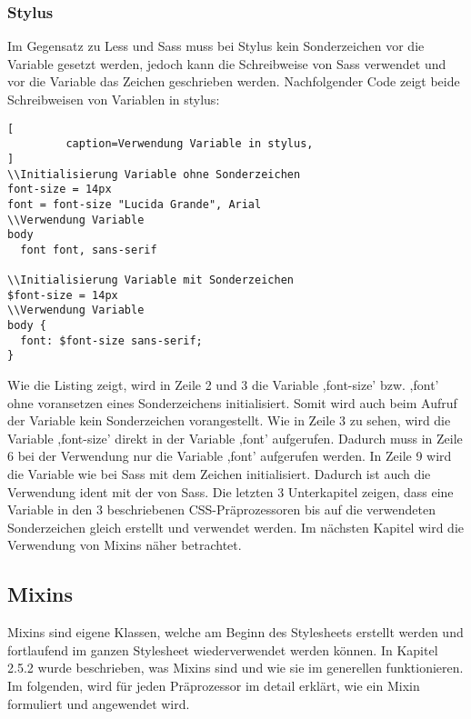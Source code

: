 \subsubsection{Stylus}
Im Gegensatz zu Less und Sass muss bei Stylus kein Sonderzeichen vor die Variable gesetzt werden, jedoch kann die Schreibweise von Sass verwendet und vor die Variable das Zeichen \grqq{\$}\glqq{} geschrieben werden. Nachfolgender Code zeigt beide Schreibweisen von Variablen in stylus:
\begin{lstlisting}[
         caption=Verwendung Variable in stylus,
]
\\Initialisierung Variable ohne Sonderzeichen
font-size = 14px
font = font-size "Lucida Grande", Arial
\\Verwendung Variable
body
  font font, sans-serif

\\Initialisierung Variable mit Sonderzeichen
$font-size = 14px
\\Verwendung Variable
body {
  font: $font-size sans-serif;
}
\end{lstlisting}
Wie die Listing zeigt, wird in Zeile 2 und 3 die Variable ,font-size' bzw. ,font' ohne voransetzen eines Sonderzeichens initialisiert. Somit wird auch beim Aufruf der Variable kein Sonderzeichen vorangestellt. Wie in Zeile 3 zu sehen, wird die Variable ,font-size' direkt in der Variable ,font' aufgerufen. Dadurch muss in Zeile 6 bei der Verwendung nur die Variable ,font' aufgerufen werden.\newline
In Zeile 9 wird die Variable wie bei Sass mit dem Zeichen \grqq{\$}\glqq{} initialisiert. Dadurch ist auch die Verwendung ident mit der von Sass.\newline\newline
Die letzten 3 Unterkapitel zeigen, dass eine Variable in den 3 beschriebenen CSS-Präprozessoren bis auf die verwendeten Sonderzeichen gleich erstellt und verwendet werden.\newline
Im nächsten Kapitel wird die Verwendung von Mixins näher betrachtet.
\subsection{Mixins}
Mixins sind eigene Klassen, welche am Beginn des Stylesheets erstellt werden und fortlaufend im ganzen Stylesheet wiederverwendet werden können. \newline
In Kapitel 2.5.2 wurde beschrieben, was Mixins sind und wie sie im generellen funktionieren. Im folgenden, wird für jeden Präprozessor im detail erklärt, wie ein Mixin formuliert und angewendet wird.
